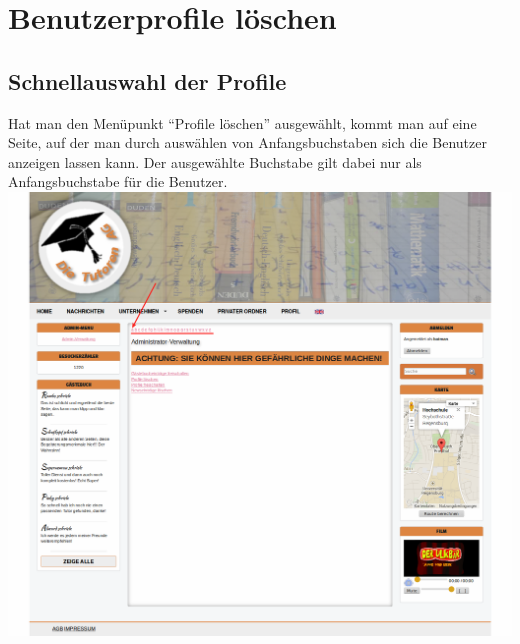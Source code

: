 
\section{Benutzerprofile löschen}
\subsection{Schnellauswahl der Profile}
Hat man den Menüpunkt ``Profile löschen'' ausgewählt, kommt man auf eine Seite, auf der man durch auswählen von Anfangsbuchstaben sich die Benutzer anzeigen lassen kann. Der ausgewählte Buchstabe gilt dabei nur 
als Anfangsbuchstabe für die Benutzer.\\
\includegraphics[width=1\textwidth]{../Screenshots/de/admin/admin_delprofile_select}
\newpage
